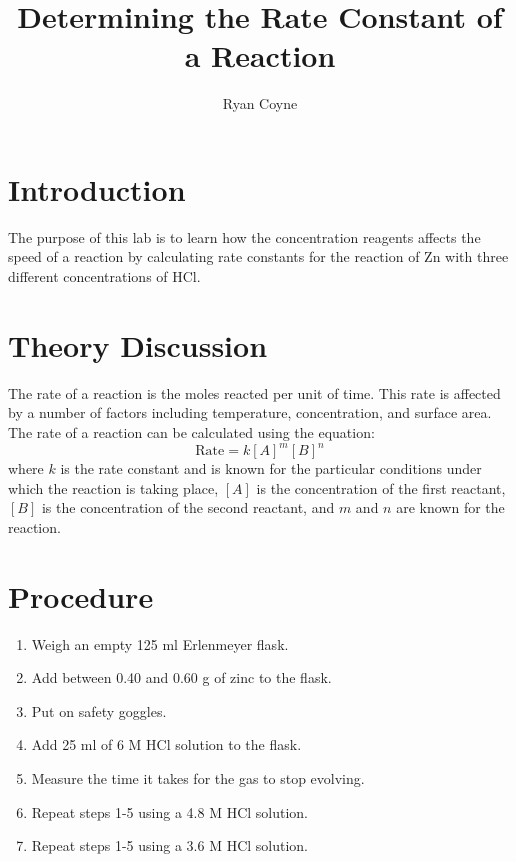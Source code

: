\documentclass[12pt]{article}
\begin{document}
    \title{Determining the Rate Constant of a Reaction}
    \author{Ryan Coyne}
    \maketitle
    \section*{Introduction}
        The purpose of this lab is to learn how the concentration reagents affects the speed of a reaction by calculating rate constants for the reaction of Zn with three different concentrations of HCl. 
    \section*{Theory Discussion}
        The rate of a reaction is the moles reacted per unit of time. This rate is affected by a number of factors including temperature, concentration, and surface area. The rate of a reaction can be calculated using the equation:
        \begin{equation*}
            \text{Rate} = k[A]^m[B]^n
        \end{equation*}
        where \(k\) is the rate constant and is known for the particular conditions under which the reaction is taking place, \([A]\) is the concentration of the first reactant, \([B]\) is the concentration of the second reactant, and \(m\) and \(n\) are known for the reaction. 
    \section*{Procedure}
    \begin{enumerate}
        \item Weigh an empty 125 ml Erlenmeyer flask.
        \item Add between 0.40 and 0.60 g of zinc to the flask.
        \item Put on safety goggles.
        \item Add 25 ml of 6 M HCl solution to the flask.
        \item Measure the time it takes for the gas to stop evolving.
        \item Repeat steps 1-5 using a 4.8 M HCl solution.
        \item Repeat steps 1-5 using a 3.6 M HCl solution.
    \end{enumerate}
\end{document}
